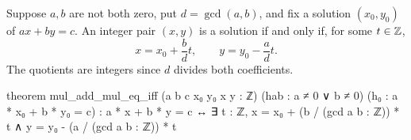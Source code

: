 \begin{theorem}
  \label{ent:thm:diophantine-general-solution}
  Suppose $a,b$ are not both zero, put $d=\gcd(a,b)$, and fix a solution $(x_0,y_0)$ of $ax+by=c$.
  An integer pair $(x,y)$ is a solution if and only if, for some $t\in\mathbb{Z}$,
  \[
    x=x_0+\frac{b}{d}t,\qquad y=y_0-\frac{a}{d}t.
  \]
  The quotients are integers since $d$ divides both coefficients.

  \begin{lean}
    theorem mul_add_mul_eq_iff (a b c x₀ y₀ x y : ℤ) (hab : a ≠ 0 ∨ b ≠ 0)
        (h₀ : a * x₀ + b * y₀ = c) :
        a * x + b * y = c ↔ ∃ t : ℤ,
          x = x₀ + (b / (gcd a b : ℤ)) * t ∧
          y = y₀ - (a / (gcd a b : ℤ)) * t
  \end{lean}
\end{theorem}

